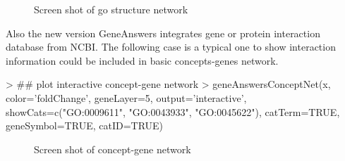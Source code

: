 \documentclass[a4paper]{article}
\begin{document}
\begin{figure}
\centering
\centering
{}
\caption{Screen shot of go structure network}
\label{conceptgeneNetwork}
\end{figure}

Also the new version GeneAnswers integrates gene or protein interaction database from NCBI. The following case is a typical one to show interaction information could be included in basic concepts-genes network.
\begin{Schunk}
\begin{Sinput}
> ## plot interactive concept-gene network
> geneAnswersConceptNet(x, color='foldChange', geneLayer=5, output='interactive', showCats=c("GO:0009611", "GO:0043933", "GO:0045622"), catTerm=TRUE, geneSymbol=TRUE, catID=TRUE)
\end{Sinput}
\end{Schunk}

\begin{figure}
\centering
\centering
{}
\caption{Screen shot of concept-gene network}
\label{conceptgeneNetwork}
\end{figure}
\end{document}
